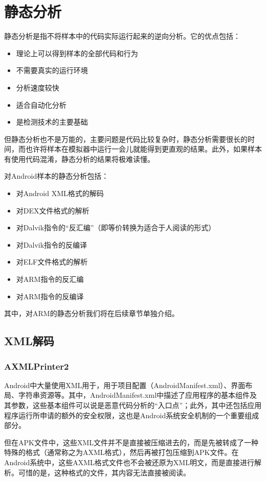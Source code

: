 \chapter{静态分析}
静态分析是指不将样本中的代码实际运行起来的逆向分析。它的优点包括：
\begin{itemize}
  \item 理论上可以得到样本的全部代码和行为
  \item 不需要真实的运行环境
  \item 分析速度较快
  \item 适合自动化分析
  \item 是检测技术的主要基础
\end{itemize}

但静态分析也不是万能的，主要问题是代码比较复杂时，静态分析需要很长的时间，而也许将样本在模拟器中运行一会儿就能得到更直观的结果。此外，如果样本有使用代码混淆，静态分析的结果将极难读懂。

对Android样本的静态分析包括：
\begin{itemize}
  \item 对Android XML格式的解码
  \item 对DEX文件格式的解析
  \item 对Dalvik指令的“反汇编”（即等价转换为适合于人阅读的形式）
  \item 对Dalvik指令的反编译
  \item 对ELF文件格式的解析
  \item 对ARM指令的反汇编
  \item 对ARM指令的反编译
\end{itemize}

其中，对ARM的静态分析我们将在后续章节单独介绍。
\section{XML解码}
\label{Sec:xml-decode}
\subsection{AXMLPrinter2}
Android中大量使用XML用于，用于项目配置（AndroidManifest.xml）、界面布局、字符串资源等。其中，AndroidManifest.xml中描述了应用程序的基本组件及其参数，这些基本组件可以说是恶意代码分析的“入口点”；此外，其中还包括应用程序运行所申请的额外的安全权限，这也是Android系统安全机制的一个重要组成部分。

但在APK文件中，这些XML文件并不是直接被压缩进去的，而是先被转成了一种特殊的格式（通常称之为AXML格式），然后再被打包压缩到APK文件。在Android系统中，这些AXML格式文件也不会被还原为XML明文，而是直接进行解析。可惜的是，这种格式的文件，其内容无法直接被阅读。

